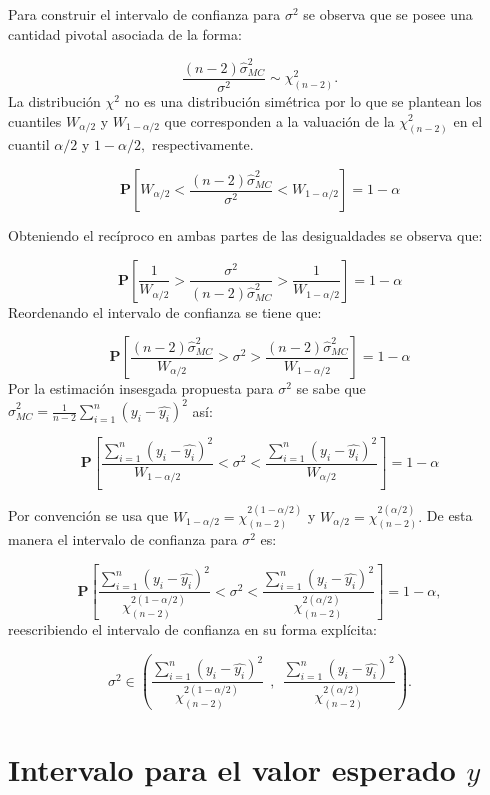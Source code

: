 \documentclass[
  a4paper,
  oneside,
  openany]{book}
\begin{document}
Para construir el intervalo de confianza para \(\sigma^2\) se observa que se posee una cantidad pivotal asociada de la forma:

\[\frac{(n-2)\hat{\sigma}^2_{MC}}{\sigma^2}\sim \chi^2_{(n-2)}.\]
La distribución \(\chi^2\) no es una distribución simétrica por lo que se plantean los cuantiles \(W_{\alpha/2}\) y \(W_{1-\alpha/2}\) que corresponden a la valuación de la \(\chi^2_{(n-2)}\) en el cuantil \(\alpha/2\) y \(1-\alpha/2,\) respectivamente.

\[\mathbf{P}\left[W_{\alpha/2}<\frac{(n-2)\hat{\sigma}^2_{MC}}{\sigma^2}< W_{1-\alpha/2}\right]=1-\alpha\]

Obteniendo el recíproco en ambas partes de las desigualdades se observa que:

\[\mathbf{P}\left[\frac{1}{W_{\alpha/2}}>\frac{\sigma^2}{(n-2)\hat{\sigma}^2_{MC}}>\frac{1} {W_{1-\alpha/2}}\right]=1-\alpha\]
Reordenando el intervalo de confianza se tiene que:

\[\mathbf{P}\left[\frac{(n-2)\hat{\sigma}^2_{MC}}{W_{\alpha/2}}>\sigma^2>\frac{(n-2)\hat{\sigma}^2_{MC}} {W_{1-\alpha/2}}\right]=1-\alpha\]
Por la estimación insesgada propuesta para \(\sigma^2\) se sabe que \(\hat{\sigma}^2_{MC}=\frac{1}{n-2}\sum_{i=1}^{n}(y_i-\hat{y_{i}})^2\) así:

\[\mathbf{P}\left[\frac{\sum_{i=1}^{n}(y_i-\hat{y_{i}})^2}{W_{1-\alpha/2}}<\sigma^2<\frac{\sum_{i=1}^{n}(y_i-\hat{y_{i}})^2} {W_{\alpha/2}}\right]=1-\alpha\]

Por convención se usa que \(W_{1-\alpha/2}=\chi^{2(1-\alpha/2)}_{(n-2)}\) y \(W_{\alpha/2}=\chi^{2(\alpha/2)}_{(n-2)}.\) De esta manera el intervalo de confianza para \(\sigma^2\) es:

\[\mathbf{P}\left[\frac{\sum_{i=1}^{n}(y_i-\hat{y_{i}})^2}{\chi^{2(1-\alpha/2)}_{(n-2)}}<\sigma^2<\frac{\sum_{i=1}^{n}(y_i-\hat{y_{i}})^2} {\chi^{2(\alpha/2)}_{(n-2)}}\right]=1-\alpha,\]
reescribiendo el intervalo de confianza en su forma explícita:

\[\sigma^2 \in \left( \frac{\sum_{i=1}^{n}(y_i-\hat{y_{i}})^2}{\chi^{2(1-\alpha/2)}_{(n-2)}} \ \ , \ \ \frac{\sum_{i=1}^{n}(y_i-\hat{y_{i}})^2} {\chi^{2(\alpha/2)}_{(n-2)}} \right).\]

\hypertarget{intervalo-para-el-valor-esperado-y}{%
\section{\texorpdfstring{Intervalo para el valor esperado \(y\)}{Intervalo para el valor esperado y}}\label{intervalo-para-el-valor-esperado-y}}
\end{document}
